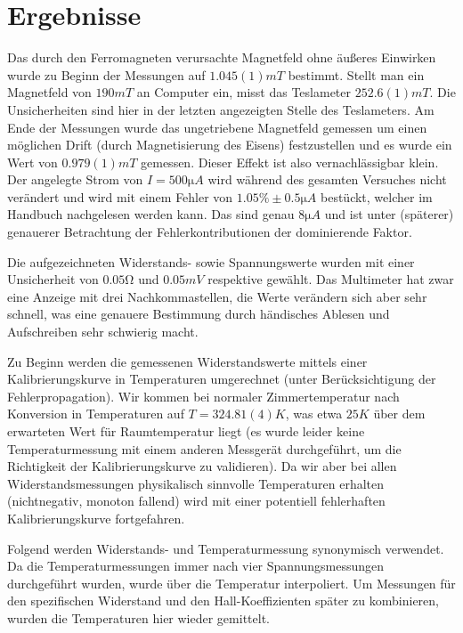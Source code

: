 \section{Ergebnisse}
Das durch den Ferromagneten verursachte Magnetfeld ohne äußeres Einwirken wurde zu Beginn der Messungen auf $1.045(1) \unit{mT}$ bestimmt. Stellt man ein Magnetfeld von $190 \unit{mT}$ an Computer ein, misst das Teslameter $252.6(1) \unit{mT}$. Die Unsicherheiten sind hier in der letzten angezeigten Stelle des Teslameters. Am Ende der Messungen wurde das ungetriebene Magnetfeld gemessen um einen möglichen Drift (durch Magnetisierung des Eisens) festzustellen und es wurde ein Wert von $0.979(1) \unit{mT}$ gemessen. Dieser Effekt ist also vernachlässigbar klein. Der angelegte Strom von $I = 500 \unit{\micro A}$ wird während des gesamten Versuches nicht verändert und wird mit einem Fehler von $1.05\% \pm 0.5 \unit{\micro A} $ bestückt, welcher im Handbuch nachgelesen werden kann. Das sind genau $8 \unit{\micro A}$ und ist unter (späterer) genauerer Betrachtung der Fehlerkontributionen der dominierende Faktor.

Die aufgezeichneten Widerstands- sowie Spannungswerte wurden mit einer Unsicherheit von $0.05 \unit{\ohm}$ und $0.05 \unit{mV}$ respektive gewählt. Das Multimeter hat zwar eine Anzeige mit drei Nachkommastellen, die Werte verändern sich aber sehr schnell, was eine genauere Bestimmung durch händisches Ablesen und Aufschreiben sehr schwierig macht.

Zu Beginn werden die gemessenen Widerstandswerte mittels einer Kalibrierungskurve \autocite{hall} in Temperaturen umgerechnet (unter Berücksichtigung der Fehlerpropagation). Wir kommen bei normaler Zimmertemperatur nach Konversion in Temperaturen auf $T = 324.81(4) \unit{K}$, was etwa $25 \unit{K}$ über dem erwarteten Wert für Raumtemperatur liegt (es wurde leider keine Temperaturmessung mit einem anderen Messgerät durchgeführt, um die Richtigkeit der Kalibrierungskurve zu validieren). Da wir aber bei allen Widerstandsmessungen physikalisch sinnvolle Temperaturen erhalten (nichtnegativ, monoton fallend) wird mit einer potentiell fehlerhaften Kalibrierungskurve fortgefahren.

Folgend werden Widerstands- und Temperaturmessung synonymisch verwendet. Da die Temperaturmessungen immer nach vier Spannungsmessungen durchgeführt wurden, wurde über die Temperatur interpoliert. Um Messungen für den spezifischen Widerstand und den Hall-Koeffizienten später zu kombinieren, wurden die Temperaturen hier wieder gemittelt.

